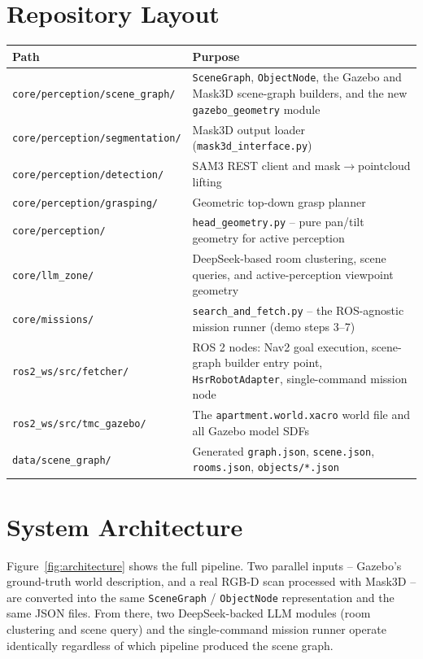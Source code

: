 \documentclass[11pt]{article}
\begin{document}
\section{Repository Layout}
\label{sec:layout}

\begin{center}
\begin{tabularx}{\textwidth}{l X}
\toprule
\textbf{Path} & \textbf{Purpose} \\
\midrule
\texttt{core/perception/scene\_graph/} & \texttt{SceneGraph}, \texttt{ObjectNode}, the Gazebo and Mask3D scene-graph builders, and the new \texttt{gazebo\_geometry} module \\
\texttt{core/perception/segmentation/} & Mask3D output loader (\texttt{mask3d\_interface.py}) \\
\texttt{core/perception/detection/} & SAM3 REST client and mask$\to$pointcloud lifting \\
\texttt{core/perception/grasping/} & Geometric top-down grasp planner \\
\texttt{core/perception/} & \texttt{head\_geometry.py} -- pure pan/tilt geometry for active perception \\
\texttt{core/llm\_zone/} & DeepSeek-based room clustering, scene queries, and active-perception viewpoint geometry \\
\texttt{core/missions/} & \texttt{search\_and\_fetch.py} -- the ROS-agnostic mission runner (demo steps 3--7) \\
\texttt{ros2\_ws/src/fetcher/} & ROS 2 nodes: Nav2 goal execution, scene-graph builder entry point, \texttt{HsrRobotAdapter}, single-command mission node \\
\texttt{ros2\_ws/src/tmc\_gazebo/} & The \texttt{apartment.world.xacro} world file and all Gazebo model SDFs \\
\texttt{data/scene\_graph/} & Generated \texttt{graph.json}, \texttt{scene.json}, \texttt{rooms.json}, \texttt{objects/*.json} \\
\bottomrule
\end{tabularx}
\end{center}

\section{System Architecture}
\label{sec:architecture}

Figure~\ref{fig:architecture} shows the full pipeline. Two parallel inputs --
Gazebo's ground-truth world description, and a real RGB-D scan processed with
Mask3D -- are converted into the same \texttt{SceneGraph} / \texttt{ObjectNode}
representation and the same JSON files. From there, two DeepSeek-backed LLM
modules (room clustering and scene query) and the single-command mission
runner operate identically regardless of which pipeline produced the scene
graph.
\end{document}
